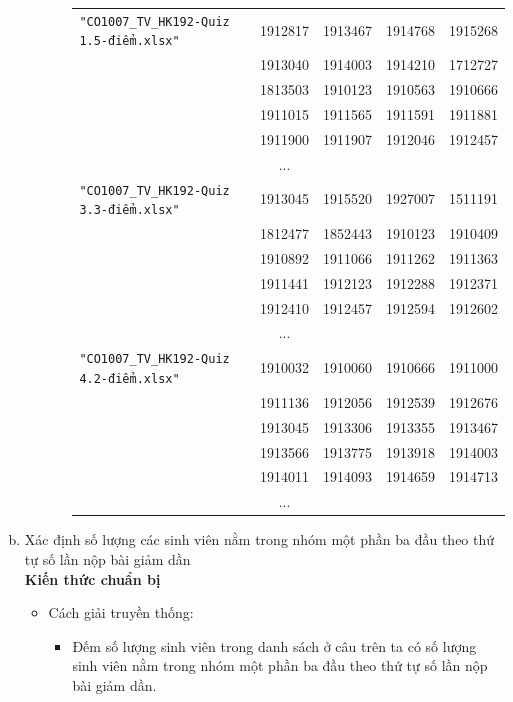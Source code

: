 \documentclass[a4paper]{article}
\theoremstyle{definition}
\begin{document}
\begin{enumerate}[a)]
\begin{itemize}
\begin{itemize}
\begin{center}
\begin{tabular}{l c c c c}
                     \texttt{"CO1007\_TV\_HK192-Quiz 1.5-điểm.xlsx"} & 1912817 & 1913467 & 1914768 & 1915268 \\ & 1913040 & 1914003 & 1914210 & 1712727 \\ & 1813503 & 1910123 & 1910563 & 1910666 \\ & 1911015 & 1911565 & 1911591 & 1911881 \\ & 1911900 & 1911907 & 1912046 & 1912457\\
                     & ...\\
                     \texttt{"CO1007\_TV\_HK192-Quiz 3.3-điểm.xlsx"} & 1913045 & 1915520 & 1927007 & 1511191 \\ & 1812477 & 1852443 & 1910123 & 1910409 \\ & 1910892 & 1911066 & 1911262 & 1911363 \\ & 1911441 & 1912123 & 1912288 & 1912371 \\ & 1912410 & 1912457 & 1912594 & 1912602\\
                     & ...\\
                     \texttt{"CO1007\_TV\_HK192-Quiz 4.2-điểm.xlsx"} & 1910032 & 1910060 & 1910666 & 1911000 \\ & 1911136 & 1912056 & 1912539 & 1912676 \\ & 1913045 & 1913306 & 1913355 & 1913467 \\ & 1913566 & 1913775 & 1913918 & 1914003 \\ & 1914011 & 1914093 & 1914659 & 1914713\\
                     & ...
                \end{tabular}
            \end{center}
        \end{itemize}
    \end{itemize}
    \bf\item {Xác định số lượng các sinh viên nằm trong nhóm một phần ba đầu theo thứ tự số lần nộp bài giảm dần}\\[6pt]
    \bf Kiến thức chuẩn bị\normalfont
    \begin{itemize}
        \item Cách giải truyền thống:
        \begin{itemize}
            \item Đếm số lượng sinh viên trong danh sách ở câu trên ta có số lượng sinh viên nằm trong nhóm một phần ba đầu theo thứ tự số lần nộp bài giảm dần.
        \end{itemize}
    \end{itemize}

\end{enumerate}
\end{document}
